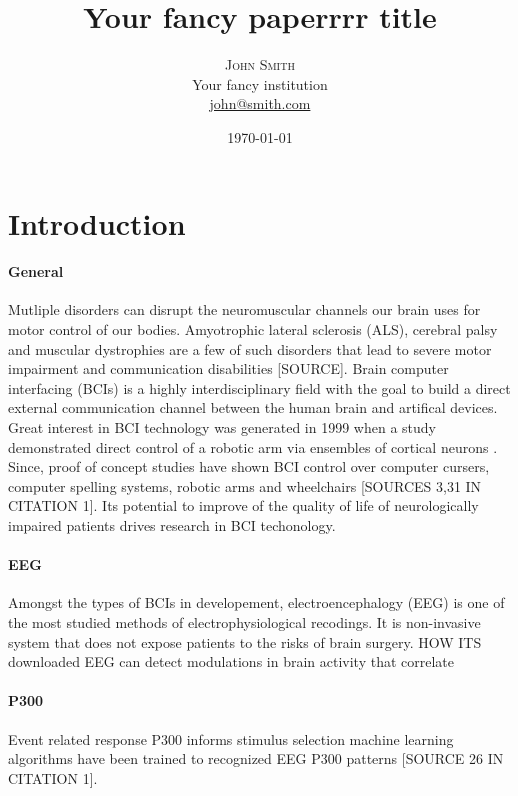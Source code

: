 \documentclass[twoside]{article}
\title{Your fancy paperrrr title} %
\author{%
\textsc{John Smith} \\[1ex] %
\normalsize Your fancy institution \\ %
\normalsize \href{mailto:john@smith.com}{john@smith.com} %
}
\date{\today} %
\begin{document}
\maketitle


\section{Introduction}
\paragraph{General}
Mutliple disorders can disrupt the neuromuscular channels our brain uses for motor control of our bodies. Amyotrophic lateral sclerosis (ALS), cerebral palsy and muscular dystrophies are a few of such disorders that lead to severe motor impairment and communication disabilities [SOURCE]. Brain computer interfacing (BCIs) is a highly interdisciplinary field with the goal to build a direct external communication channel between the human brain and artifical devices. Great interest in  BCI technology was generated in 1999 when a study demonstrated direct control of a robotic arm via ensembles of cortical neurons \cite{Chapin:1999}. Since, proof of concept studies have shown BCI control over computer cursers, computer spelling systems, robotic arms and wheelchairs [SOURCES 3,31 IN CITATION 1]. Its potential to improve of the quality of life of neurologically impaired patients drives research in BCI techonology.

\paragraph{EEG}
Amongst the types of BCIs in developement, electroencephalogy (EEG) is one of the most studied methods of electrophysiological recodings. It is non-invasive system that does not expose patients to the risks of brain surgery. HOW ITS downloaded
EEG can detect modulations in brain activity that correlate

\paragraph{P300}
Event related response P300
informs stimulus selection
machine learning algorithms have been trained to recognized EEG P300 patterns [SOURCE 26 IN CITATION 1].
\end{document}
